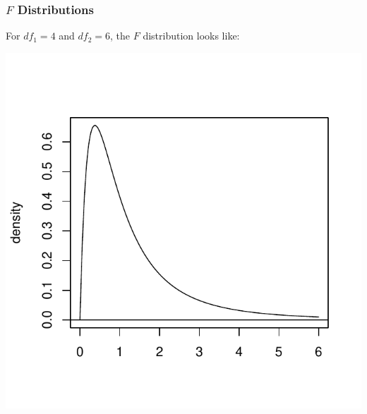 \documentclass[handout]{beamer}
\begin{document}
\begin{frame}
\frametitle{$F$ Distributions}
For $df_1 = 4$ and $df_2=6$, the $F$ distribution looks like:
\begin{center}
\includegraphics{figure/lec22-009}
\end{center}
\end{frame}
\end{document}
